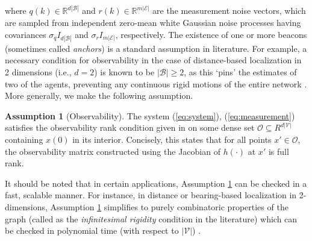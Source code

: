 \documentclass[twocolumn]{article}
\theoremstyle{plain}
\theoremstyle{definition}
\theoremstyle{definition}
\newtheorem{assumption}{Assumption}
\theoremstyle{remark}
\begin{document}
where $q(k)\in \mathbb R^{d|\mathcal B|}$ and $r(k)\in \mathbb R^{m|\mathcal E|}$ are the measurement noise vectors, which are sampled from independent zero-mean white Gaussian noise processes having covariances $\sigma_q I_{d|\mathcal B|}$ and $\sigma_r I_{m|\mathcal E|}$, respectively. The existence of one or more beacons (sometimes called \textit{anchors}) is a standard assumption in literature. For example, a necessary condition for observability in the case of distance-based localization in 2 dimensions (i.e., $d=2$) is known to be $|\mathcal B|\geq 2$, as this `pins' the estimates of two of the agents, preventing any continuous rigid motions of the entire network \cite{observability2015}. More generally, we make the following assumption.

\begin{assumption}[Observability]
The system (\ref{eq:system}), (\ref{eq:measurement}) satisfies the observability rank condition given in \cite{ekf1995} on some dense set $\mathcal O \subseteq R^{d|\mathcal V|}$ containing $x(0)$ in its interior. Concisely, this states that for all points $x'\in \mathcal O$, the observability matrix constructed using the Jacobian of $h(\cdot)$ at $x'$ is full rank.
\label{ass:observability}
\end{assumption}
It should be noted that in certain applications, Assumption \ref{ass:observability} can be checked in a fast, scalable manner. For instance, in distance or bearing-based localization in 2-dimensions, Assumption \ref{ass:observability} simplifies to purely combinatoric properties of the graph (called as the \textit{infinitesimal rigidity} condition in the literature) which can be checked in polynomial time (with respect to $|\mathcal V|$) \cite{observability2015, zhao2019bearing}.
\end{document}

